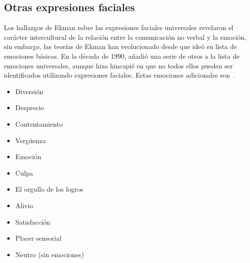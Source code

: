 \subsection{Otras expresiones faciales}
Los hallazgos de Ekman sobre las expresiones faciales universales revelaron el carácter intercultural de la relación entre la comunicación no verbal y la emoción, sin embargo, las teorías de Ekman han evolucionado desde que ideó su lista de emociones básicas. En la década de 1990, añadió una serie de otros a la lista de emociones universales, aunque hizo hincapié en que no todos ellos pueden ser identificados utilizando expresiones faciales. Estas emociones adicionales son~\cite{29ekman2016scientists}.

\begin{itemize}
\item Diversión
\item Desprecio
\item Contentamiento
\item Vergüenza	
\item Emoción
\item Culpa
\item El orgullo de los logros
\item Alivio
\item Satisfacción
\item Placer sensorial
\item Neutro (sin emociones)
\end{itemize}
